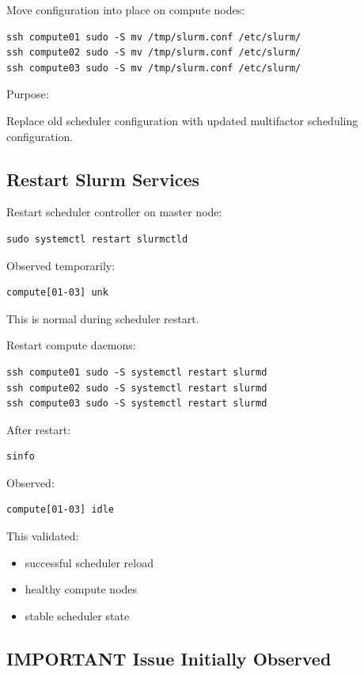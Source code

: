 \documentclass[11pt]{article}
\begin{document}
Move configuration into place on compute nodes:

\begin{verbatim}
ssh compute01 sudo -S mv /tmp/slurm.conf /etc/slurm/
ssh compute02 sudo -S mv /tmp/slurm.conf /etc/slurm/
ssh compute03 sudo -S mv /tmp/slurm.conf /etc/slurm/
\end{verbatim}

Purpose:

Replace old scheduler configuration with updated multifactor scheduling
configuration.
\subsection{Restart Slurm Services}
\label{sec:org99eec35}

Restart scheduler controller on master node:

\begin{verbatim}
sudo systemctl restart slurmctld
\end{verbatim}

Observed temporarily:

\begin{verbatim}
compute[01-03] unk
\end{verbatim}

This is normal during scheduler restart.

Restart compute daemons:

\begin{verbatim}
ssh compute01 sudo -S systemctl restart slurmd
ssh compute02 sudo -S systemctl restart slurmd
ssh compute03 sudo -S systemctl restart slurmd
\end{verbatim}

After restart:

\begin{verbatim}
sinfo
\end{verbatim}

Observed:

\begin{verbatim}
compute[01-03] idle
\end{verbatim}

This validated:

\begin{itemize}
\item successful scheduler reload
\item healthy compute nodes
\item stable scheduler state
\end{itemize}
\subsection{IMPORTANT Issue Initially Observed}
\label{sec:org1e292f0}
\end{document}
